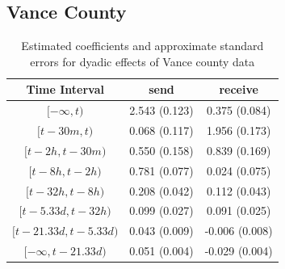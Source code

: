 \documentclass[a4paper]{article}
\begin{document}
\subsection{Vance County}
\footnotesize
\begin{table}[ht]
	\centering
	\begin{tabular}{ |c|cc| } 
		\hline 
		\textbf{Time Interval} &\textbf{send} & \textbf{receive} \\ 	
		\hline  $[-\infty, t)$&  2.543 (0.123)& 0.375 (0.084) \\  $[t-30 m, t)$ &  0.068 (0.117) &  1.956 (0.173) \\  $[t-2h, t-30m)$& 0.550 (0.158) & 0.839 (0.169)\\ $[t-8h, t-2h)$ & 0.781 (0.077)&  0.024 (0.075)\\ $[t-32h, t-8h)$& 0.208 (0.042)  &  0.112 (0.043)\\ $[t-5.33d, t-32h)$&  0.099 (0.027)& 0.091 (0.025)\\ $[t-21.33d, t-5.33d)$  & 0.043 (0.009) & -0.006 (0.008)\\ 
		$[-\infty, t-21.33d)$  & 0.051 (0.004)& -0.029 (0.004)  \\
		\hline
	\end{tabular}
	\caption {Estimated coefficients and approximate standard errors for dyadic effects of Vance county data}
	\label{table:nullVance}
\end{table}
\normalsize
\end{document}
